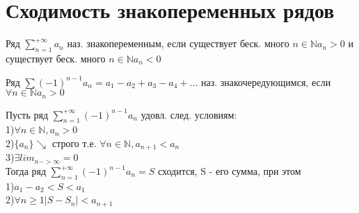 \section{Сходимость знакопеременных рядов}

\begin{Def}
    Ряд $\sum_{n=1}^{+\infty}a_n$ наз. знакопеременным, если существует беск. много $n \in \mathbb{N} a_n>0$ 
 и существует беск. много $n\in \mathbb{N} a_n<0$\\
\end{Def}

\begin{Def}
    Ряд $\sum (-1)^{n-1} a_n = a_1-a_2+a_3-a_4+...$ наз. знакочередующимся, если $\forall n \in \mathbb{N} a_n>0$\\
\end{Def}

\begin{Def}
    Пусть ряд $\sum_{n=1}^{+\infty} (-1)^{n-1} a_n $ удовл. след. условиям:\\
    1)$\forall n \in \mathbb{N}, a_n>0$\\
    2)$\{a_n\} \searrow$ строго т.е. $\forall n \in \mathbb{N}, a_{n+1}<a_n$\\
    3)$\exists lim_{n->\infty}=0$\\
    Тогда ряд $\sum_{n=1}^{+\infty} (-1)^{n-1} a_n = S$ сходится, S - его сумма, при этом\\
    1)$a_1-a_2<S<a_1$\\
    2)$\forall n \geqslant 1 |S-S_n|<a_{n+1}$\\
\end{Def}

